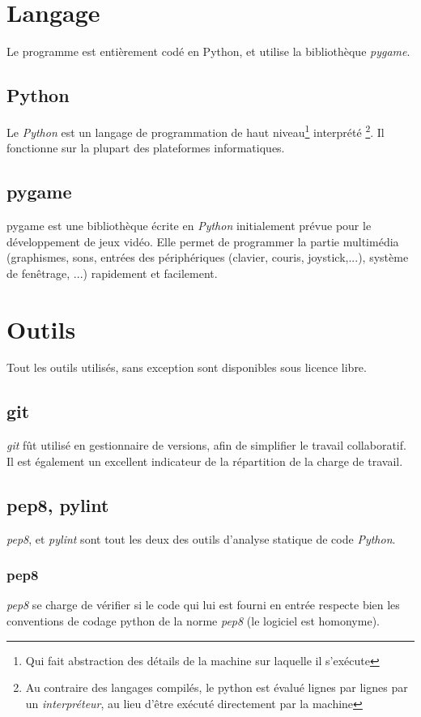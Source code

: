 \section{Langage}
    Le programme est entièrement codé en Python,
    et utilise la bibliothèque \emph{pygame}.
    \subsection{Python}
        Le \emph{Python} est un langage de programmation de haut niveau\footnote{Qui fait
        abstraction des détails de la machine sur laquelle il s'exécute} interprété
        \footnote{Au contraire des langages compilés, le python est évalué
        lignes par lignes par un \emph{interpréteur}, au lieu d'être exécuté directement
        par la machine}. Il fonctionne sur la plupart des plateformes informatiques.
    \subsection{pygame}
        pygame est une bibliothèque écrite en \emph{Python} initialement prévue pour
        le développement de jeux vidéo. Elle permet de programmer la partie multimédia
        (graphismes, sons, entrées des périphériques (clavier, couris, joystick,...),
        système de fenêtrage, ...) rapidement et facilement.

\section{Outils}
    Tout les outils utilisés, sans exception sont disponibles sous
    licence libre.
    \subsection{git}
        \emph{git} fût utilisé en gestionnaire de versions,
        afin de simplifier le travail collaboratif.
        Il est également un excellent indicateur de la répartition
        de la charge de travail.
    \subsection{pep8, pylint}
        \emph{pep8}, et \emph{pylint} sont tout les deux
        des outils d'analyse statique de code \emph{Python}.
        \subsubsection{pep8}
            \emph{pep8} se charge de vérifier si le code qui lui
            est fourni en entrée respecte bien les conventions de codage
            python de la norme \emph{pep8} (le logiciel est homonyme).
